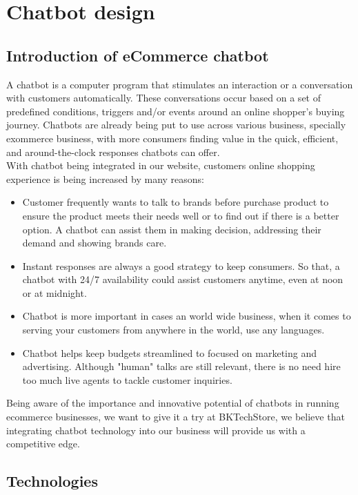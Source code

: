 \section{Chatbot design}
\subsection{ Introduction of eCommerce chatbot}

\noindent A chatbot is a computer program that stimulates an interaction or a conversation with customers automatically. These conversations occur based on a set of predefined conditions, triggers and/or events around an online shopper’s buying journey. Chatbots are already being put to use across various business, specially exommerce business, with more consumers finding value in the quick, efficient, and around-the-clock responses chatbots can offer. \\

\noindent With chatbot being integrated in our website, customers online shopping experience is being increased by many reasons:
\begin{itemize}
    \item Customer frequently wants to talk to brands before purchase product to ensure the product meets their needs well or to find out if there is a better option. A chatbot can assist them in making decision, addressing their demand and showing brands care.
    \item Instant responses are always a good strategy to keep consumers. So that, a chatbot with 24/7 availability could assist customers anytime, even at noon or at midnight.
    \item Chatbot is more important in cases an world wide business, when it comes to serving your customers from anywhere in the world, use any languages.
    \item Chatbot helps keep budgets streamlined to focused on marketing and advertising. Although "human" talks are still relevant, there is no need hire too much live agents to tackle customer inquiries.
\end{itemize}

Being aware of the importance and innovative potential of chatbots in running ecommerce businesses, we want to give it a try at BKTechStore, we believe that integrating chatbot technology into our business will provide us with a competitive edge.

\subsection{Technologies}
